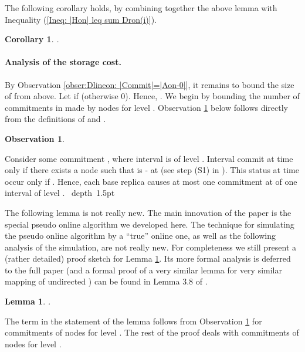 \documentclass[11pt]{article}
\newtheorem{lem}[theorem]{Lemma}
\newtheorem{corollary}[theorem]{Corollary}
\newtheorem{observation}[theorem]{Observation}
\def\proof{\par\noindent{\bf Proof:~}}
\def\blackslug{\hbox{\hskip 1pt \vrule width 4pt height 8pt
    depth 1.5pt \hskip 1pt}}
\def\QED{\quad\blackslug\lower 8.5pt\null\par}
\begin{document}
\noindent The following corollary holds, by combining together the above lemma  with Inequality (\ref{Ineq: |Hon| leq sum Dron(i)}).



\begin{corollary}
.
\label{corollary:Dlineon: delivery cost}
\end{corollary}


\vspace{-0.3cm}
\paragraph*{\bf Analysis of the storage cost\commsingle.\commsingleend}



By Observation \ref{obser:Dlineon: |Commit|=|Aon-0|},
it remains to bound the size of  from above.
Let  if  (otherwise 0).
Hence,
.
We begin by bounding the number of commitments in  made by nodes for level .
Observation \ref{obser:Dlineon Base acounts level l=0 committments} below follows directly from the definitions of  and .

\vspace{0.2cm}
\begin{observation}

\label{obser:Dlineon Base acounts level l=0 committments}
\end{observation}
\proof
Consider some commitment , where interval  is of level .
Interval  commit at time  only if there exists a node  such that  is - at  (see step (S1) in ).
This  status at time  occur only if .
Hence, each base replica causes at most one commitment at  of one interval of level .
\QED


The following lemma is not really new.
The main innovation of the paper is the special pseudo online algorithm we developed here.
The technique for simulating the pseudo online algorithm by a ``true'' online one, as well as the following
analysis of the simulation, are not really new.
For completeness we still present a (rather detailed) proof sketch for Lemma \ref{lem:Dlineon: storage cost < Hoff + Aoff}.
Its more formal analysis is deferred to the full paper
(and a formal proof of a very similar lemma for very similar mapping of undirected )
can be found in Lemma 3.8 of \cite{KK2014TR}.


\vspace{0.2cm}
\begin{lem}
.
\label{lem:Dlineon: storage cost < Hoff + Aoff}
\end{lem}
The  term in the statement of the lemma follows from Observation \ref{obser:Dlineon Base acounts level l=0 committments} for commitments of nodes for level .
The rest of the proof deals with commitments of nodes for level .
\end{document}
